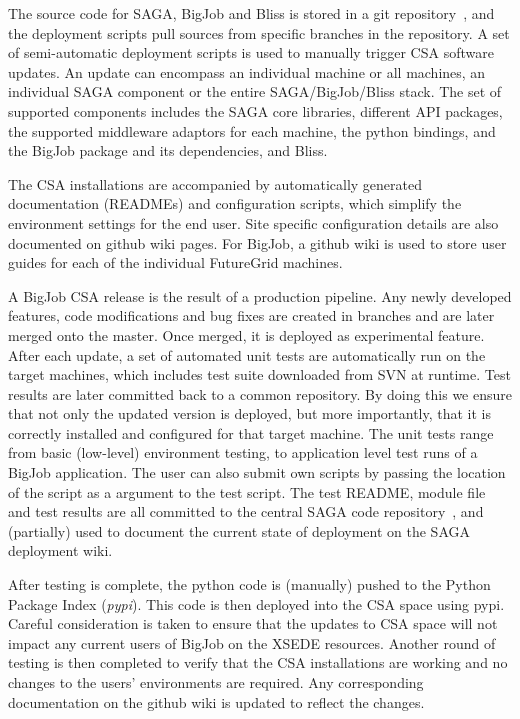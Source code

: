 \documentclass[]{paper}
\begin{document}
The source code for SAGA, BigJob and Bliss is stored in a git
repository~\cite{saga-github}, and the deployment scripts pull sources
from specific branches in the repository.  A set of semi-automatic
deployment scripts is used to manually trigger CSA software updates.
An update can encompass an individual machine or all machines, an
individual SAGA component or the entire SAGA/BigJob/Bliss stack. The
set of supported components includes the SAGA core libraries,
different API packages, the supported middleware adaptors for each
machine, the python bindings, and the BigJob package and its
dependencies, and Bliss. 

The CSA installations are accompanied by automatically generated
documentation (READMEs) and configuration scripts, which simplify the
environment settings for the end user.  Site specific configuration
details are also documented on github wiki pages.  For BigJob, a
github wiki is used to store user guides for each of the individual
FutureGrid machines. 

A BigJob CSA release is the result of a production pipeline. Any newly
developed features, code modifications and bug fixes are created in
branches and are later merged onto the master. Once merged, it is
deployed as experimental feature.  After each update, a set of
automated unit tests are automatically run on the target machines,
which includes test suite downloaded from SVN at runtime.  Test
results are later committed back to a common repository.  By doing
this we ensure that not only the updated version is deployed, but more
importantly, that it is correctly installed and configured for that
target machine. The unit tests range from basic (low-level)
environment testing, to application level test runs of a BigJob
application. The user can also submit own scripts by passing the
location of the script as a argument to the test script. The test
README, module file and test results are all committed to the central
SAGA code repository~\cite{r_link}, and (partially) used to document
the current state of deployment on the SAGA deployment wiki. 

After testing is complete, the python code is (manually) pushed to the
Python Package Index (\textit{pypi}). This code is then deployed into
the CSA space using pypi. Careful consideration is taken to ensure
that the updates to CSA space will not impact any current users of
BigJob on the XSEDE resources. Another round of testing is then
completed to verify that the CSA installations are working and no
changes to the users' environments are required. Any corresponding
documentation on the github wiki is updated to reflect the changes.
\end{document}
